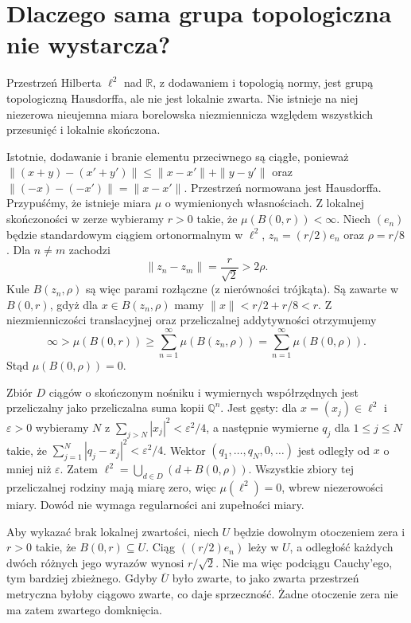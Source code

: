 \section{Dlaczego sama grupa topologiczna nie wystarcza?}
\begin{przyklad}
\label{it:ex:haar-ell2}
Przestrzeń Hilberta $\ell^2$ nad $\mathbb R$, z dodawaniem
i topologią normy, jest grupą topologiczną Hausdorffa,
ale nie jest lokalnie zwarta. Nie istnieje na niej
niezerowa nieujemna miara borelowska niezmiennicza
względem wszystkich przesunięć i lokalnie skończona.

Istotnie, dodawanie i branie elementu przeciwnego są
ciągłe, ponieważ
$\|(x+y)-(x'+y')\|\le\|x-x'\|+\|y-y'\|$
oraz $\|(-x)-(-x')\|=\|x-x'\|$.
Przestrzeń normowana jest Hausdorffa.
Przypuśćmy, że istnieje miara $\mu$ o wymienionych
własnościach. Z lokalnej skończoności w zerze
wybieramy $r>0$ takie, że $\mu(B(0,r))<\infty$.
Niech $(e_n)$ będzie standardowym ciągiem
ortonormalnym w $\ell^2$, $z_n=(r/2)e_n$ oraz
$\rho=r/8$. Dla $n\ne m$ zachodzi
\[
 \|z_n-z_m\|=\frac{r}{\sqrt2}>2\rho.
\]
Kule $B(z_n,\rho)$ są więc parami rozłączne
(z nierówności trójkąta). Są zawarte w $B(0,r)$,
gdyż dla $x\in B(z_n,\rho)$ mamy
$\|x\|<r/2+r/8<r$.
Z niezmienniczości translacyjnej oraz
przeliczalnej addytywności otrzymujemy
\[
 \infty>\mu(B(0,r))
 \ge\sum_{n=1}^\infty\mu(B(z_n,\rho))
 =\sum_{n=1}^\infty\mu(B(0,\rho)).
\]
Stąd $\mu(B(0,\rho))=0$.

Zbiór $D$ ciągów o skończonym nośniku i wymiernych
współrzędnych jest przeliczalny jako przeliczalna
suma kopii $\mathbb Q^n$. Jest gęsty: dla
$x=(x_j)\in\ell^2$ i $\varepsilon>0$ wybieramy
$N$ z $\sum_{j>N}|x_j|^2<\varepsilon^2/4$,
a następnie wymierne $q_j$ dla $1\le j\le N$
takie, że $\sum_{j=1}^N|q_j-x_j|^2<\varepsilon^2/4$.
Wektor $(q_1,\ldots,q_N,0,\ldots)$ jest odległy
od $x$ o mniej niż $\varepsilon$.
Zatem $\ell^2=\bigcup_{d\in D}(d+B(0,\rho))$.
Wszystkie zbiory tej przeliczalnej rodziny
mają miarę zero, więc $\mu(\ell^2)=0$, wbrew
niezerowości miary. Dowód nie wymaga regularności
ani zupełności miary.

Aby wykazać brak lokalnej zwartości, niech $U$
będzie dowolnym otoczeniem zera i $r>0$ takie,
że $B(0,r)\subseteq U$. Ciąg $((r/2)e_n)$
leży w $U$, a odległość każdych dwóch różnych
jego wyrazów wynosi $r/\sqrt2$. Nie ma więc
podciągu Cauchy'ego, tym bardziej zbieżnego.
Gdyby $\overline U$ było zwarte, to jako
zwarta przestrzeń metryczna byłoby ciągowo zwarte,
co daje sprzeczność. Żadne otoczenie zera nie ma
zatem zwartego domknięcia.
\end{przyklad}

